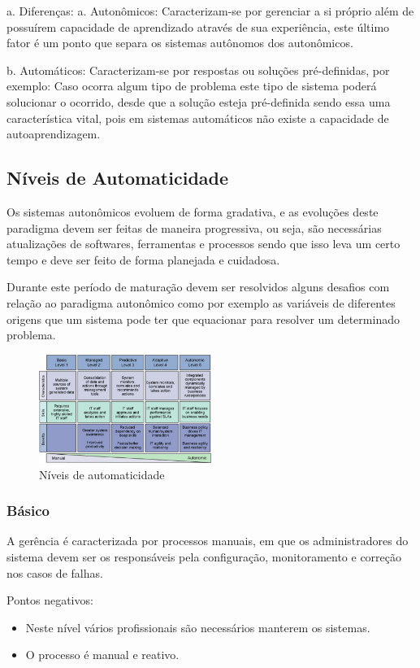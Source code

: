\documentclass[11pt,twoside]{article}
\begin{document}
a.	Diferenças:
a.	Autonômicos: Caracterizam-se por gerenciar a si próprio além de possuírem capacidade de aprendizado através de sua experiência, este último fator é um ponto que separa os sistemas autônomos dos autonômicos.

b.	Automáticos: Caracterizam-se por respostas ou soluções pré-definidas, por exemplo: Caso ocorra algum tipo de problema este tipo de sistema poderá solucionar o ocorrido, desde que a solução esteja pré-definida sendo essa uma característica vital, pois em sistemas automáticos não existe a capacidade de autoaprendizagem.

\subsection{Níveis de Automaticidade}
Os sistemas autonômicos evoluem de forma gradativa, e as evoluções deste paradigma devem ser feitas de maneira progressiva, ou seja, são necessárias atualizações de softwares, ferramentas e processos sendo que isso leva um certo tempo e deve ser feito de forma planejada e cuidadosa. 

Durante este período de maturação devem ser resolvidos alguns desafios com relação ao paradigma autonômico como por exemplo as variáveis de diferentes origens que um sistema pode ter que equacionar para resolver um determinado problema. 

\begin{figure}
    \centering
    \includegraphics[width=0.5\textwidth]{Picture2.png}
	\caption{Níveis de automaticidade}
    \label{Sec:Intro:Fig2}
\end{figure}


\subsubsection{Básico}
A gerência é caracterizada por processos manuais, em que os administradores do sistema devem ser os responsáveis pela configuração, monitoramento e correção nos casos de falhas. 

Pontos negativos: 
\begin{itemize}
\item Neste nível vários profissionais são necessários manterem os sistemas.
\item O processo é manual e reativo.
\end{itemize}
\end{document}
